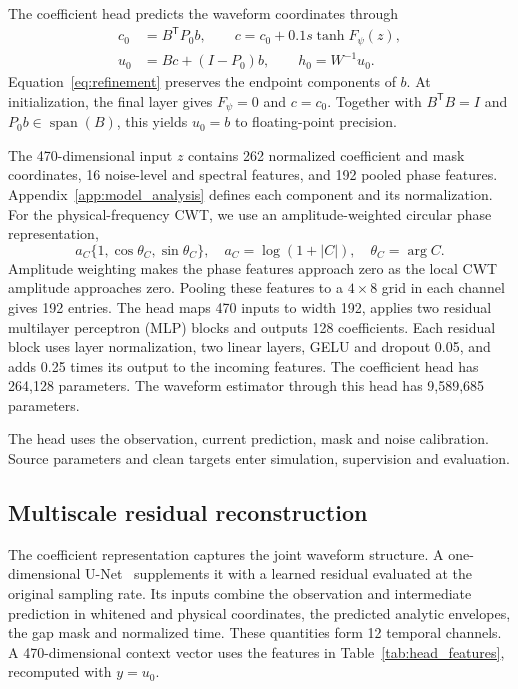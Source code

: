 \documentclass[10pt,prd,aps,a4paper,twocolumn,superscriptaddress,nofootinbib,floatfix]{revtex4-2}
\begin{document}
The coefficient head predicts the waveform coordinates through
\begin{align}
c_0&=B^{\mathsf T}P_0b,\qquad
c=c_0+0.1s\tanh F_\psi(z),\label{eq:refinement}\\
u_0&=Bc+(I-P_0)b,\qquad h_0=W^{-1}u_0.\nonumber
\end{align}
Equation~\eqref{eq:refinement} preserves the endpoint components of $b$. At initialization, the final layer gives $F_\psi=0$ and $c=c_0$. Together with $B^{\mathsf T}B=I$ and $P_0b\in\operatorname{span}(B)$, this yields $u_0=b$ to floating-point precision.

The 470-dimensional input $z$ contains 262 normalized coefficient and mask coordinates, 16 noise-level and spectral features, and 192 pooled phase features. Appendix~\ref{app:model_analysis} defines each component and its normalization. For the physical-frequency CWT, we use an amplitude-weighted circular phase representation,
\begin{equation}
a_C\{1,\cos\theta_C,\sin\theta_C\},\quad
a_C=\log(1+|C|),\quad\theta_C=\arg C.\label{eq:continuous_phase}
\end{equation}
Amplitude weighting makes the phase features approach zero as the local CWT amplitude approaches zero. Pooling these features to a $4\times8$ grid in each channel gives 192 entries. The head maps 470 inputs to width 192, applies two residual multilayer perceptron (MLP) blocks and outputs 128 coefficients. Each residual block uses layer normalization, two linear layers, GELU and dropout 0.05, and adds 0.25 times its output to the incoming features. The coefficient head has 264,128 parameters. The waveform estimator through this head has 9,589,685 parameters.

The head uses the observation, current prediction, mask and noise calibration. Source parameters and clean targets enter simulation, supervision and evaluation.

\subsection{Multiscale residual reconstruction}\label{sec:multiscale}
The coefficient representation captures the joint waveform structure. A one-dimensional U-Net~\cite{Ronneberger2015UNet} supplements it with a learned residual evaluated at the original sampling rate. Its inputs combine the observation and intermediate prediction in whitened and physical coordinates, the predicted analytic envelopes, the gap mask and normalized time. These quantities form 12 temporal channels. A 470-dimensional context vector uses the features in Table~\ref{tab:head_features}, recomputed with $y=u_0$.
\end{document}
